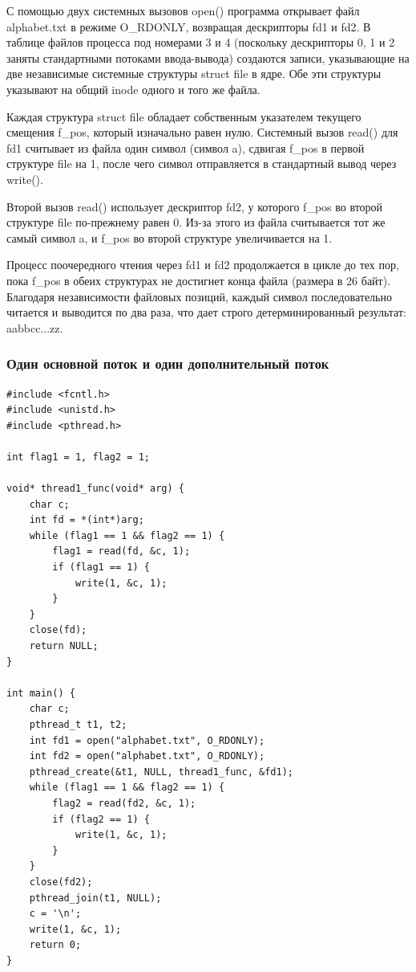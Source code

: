 С помощью двух системных вызовов open() программа открывает файл alphabet.txt в режиме O\_RDONLY, возвращая дескрипторы fd1 и fd2. В таблице файлов процесса под номерами 3 и 4 (поскольку дескрипторы 0, 1 и 2 заняты стандартными потоками ввода-вывода) создаются записи, указывающие на две независимые системные структуры struct file в ядре. Обе эти структуры указывают на общий inode одного и того же файла.

Каждая структура struct file обладает собственным указателем текущего смещения f\_pos, который изначально равен нулю. Системный вызов read() для fd1 считывает из файла один символ (символ a), сдвигая f\_pos в первой структуре file на 1, после чего символ отправляется в стандартный вывод через write().

Второй вызов read() использует дескриптор fd2, у которого f\_pos во второй структуре file по-прежнему равен 0. Из-за этого из файла считывается тот же самый символ a, и f\_pos во второй структуре увеличивается на 1.

Процесс поочередного чтения через fd1 и fd2 продолжается в цикле до тех пор, пока f\_pos в обеих структурах не достигнет конца файла (размера в 26 байт). Благодаря независимости файловых позиций, каждый символ последовательно читается и выводится по два раза, что дает строго детерминированный результат: aabbcc...zz.

\clearpage

\subsubsection{Один основной поток и один дополнительный поток}
\begin{lstlisting}[caption={Исходный код Программы 2 с одним дополнительным потоком}]
#include <fcntl.h>
#include <unistd.h>
#include <pthread.h>

int flag1 = 1, flag2 = 1;

void* thread1_func(void* arg) {
    char c;
    int fd = *(int*)arg;
    while (flag1 == 1 && flag2 == 1) {
        flag1 = read(fd, &c, 1);
        if (flag1 == 1) {
            write(1, &c, 1);
        }
    }
    close(fd);
    return NULL;
}

int main() {
    char c;
    pthread_t t1, t2;
    int fd1 = open("alphabet.txt", O_RDONLY);
    int fd2 = open("alphabet.txt", O_RDONLY);
    pthread_create(&t1, NULL, thread1_func, &fd1);
    while (flag1 == 1 && flag2 == 1) {
        flag2 = read(fd2, &c, 1);
        if (flag2 == 1) {
            write(1, &c, 1);
        }
    }
    close(fd2);
    pthread_join(t1, NULL);
    c = '\n';
    write(1, &c, 1);
    return 0;
}
\end{lstlisting}

